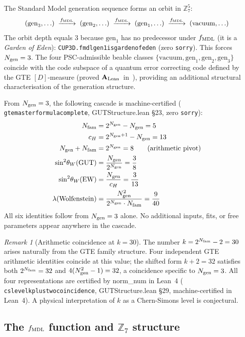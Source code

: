 \documentclass[11pt]{article}
\theoremstyle{remark}
\newtheorem{remark}[theorem]{Remark}
\newcommand{\ZS}{\mathbb{Z}_7}
\newcommand{\Ngen}{N_{\rm gen}}
\newcommand{\Nfam}{N_{\rm fam}}
\newcommand{\cH}{c_H}
\newcommand{\fmdl}{f_{\rm MDL}}
\newcommand{\lean}[1]{%
  \penalty-100
  \begingroup\def\_{\textunderscore\allowbreak}\texttt{#1}\endgroup}
\newcommand{\sinwsq}{\sin^2\!\theta_W}
\newcommand{\lam}{\lambda}
\newcommand{\CatAL}{\ensuremath{\textbf{A}_{\rm Lean}}}
\begin{document}
The Standard Model generation sequence forms an orbit in $\ZS^5$:
\[
  (\text{gen}_3, \ldots) \;\xrightarrow{\fmdl}\; (\text{gen}_2, \ldots)
  \;\xrightarrow{\fmdl}\; (\text{gen}_1, \ldots)
  \;\xrightarrow{\fmdl}\; (\text{vacuum}, \ldots)
\]
The orbit depth equals 3 because $\text{gen}_1$ has no predecessor under $\fmdl$
(it is a \emph{Garden of Eden}):
\lean{CUP3D.fmdl\_gen1\_is\_garden\_of\_eden} (zero \texttt{sorry}).
This forces $\Ngen = 3$.
The four PSC-admissible beable classes $\{\text{vacuum}, \text{gen}_1, \text{gen}_2,
\text{gen}_3\}$ coincide with the code subspace of a quantum error correcting code
defined by the GTE $[D]$-measure (proved \CatAL\ in~\cite{SpivackGTEMobius}), providing
an additional structural characterisation of the generation structure.

From $\Ngen = 3$, the following cascade is machine-certified
(\lean{gte\_master\_formula\_complete}, GUTStructure.lean \S23, zero \texttt{sorry}):
\begin{align}
  \Nfam &= 2^{\Ngen} - \Ngen = 5 \label{eq:nfam}\\
  \cH   &= 2^{\Ngen+1} - \Ngen = 13 \label{eq:ch}\\
  \Ngen + \Nfam &= 2^{\Ngen} = 8 \qquad \text{(arithmetic pivot)} \label{eq:pivot}\\
  \sinwsq(\text{GUT}) &= \frac{\Ngen}{2^{\Ngen}} = \frac{3}{8} \label{eq:gutw}\\
  \sinwsq(\text{EW})  &= \frac{\Ngen}{\cH} = \frac{3}{13} \label{eq:eww}\\
  \lam(\text{Wolfenstein}) &= \frac{\Ngen^2}{2^{\Ngen} \cdot \Nfam} = \frac{9}{40} \label{eq:lam}
\end{align}
All six identities follow from $\Ngen = 3$ alone.
No additional inputs, fits, or free parameters appear anywhere in the cascade.

\begin{remark}[Arithmetic coincidence at $k = 30$]
\label{rem:k30}
The number $k = 2^{\Nfam} - 2 = 30$ arises naturally from the GTE family structure.
Four independent GTE arithmetic identities coincide at this value; the shifted form
$k + 2 = 32$ satisfies both $2^{\Nfam} = 32$ and $4(\Ngen^2 - 1) = 32$, a coincidence
specific to $\Ngen = 3$.
All four representations are certified by norm\_num in Lean~4
(\lean{cs\_level\_k\_plus\_two\_coincidence}, GUTStructure.lean \S29, machine-certified in Lean~4).
A physical interpretation of $k$ as a Chern-Simons level is conjectural.
\end{remark}

\subsection{The \texorpdfstring{$f_{\rm MDL}$}{fMDL} function and \texorpdfstring{$\mathbb{Z}_7$}{Z7} structure}
\label{sec:fmdl}
\end{document}
